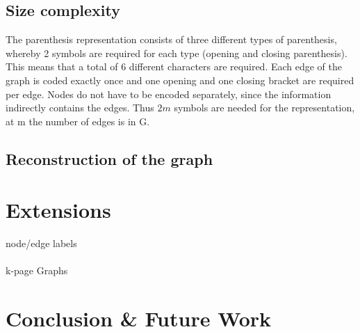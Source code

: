 \documentclass[a4paper]{scrartcl}
\begin{document}
\subsection{Size complexity}

The parenthesis representation consists of three different types of parenthesis, whereby 2 symbols are required for each type (opening and closing parenthesis). This means that a total of 6 different characters are required. Each edge of the graph is coded exactly once and one opening and one closing bracket are required per edge. Nodes do not have to be encoded separately, since the information indirectly contains the edges. Thus $2m$ symbols are needed for the representation, at m the number of edges is in G.


\subsection{Reconstruction of the graph}

\section{Extensions}

node/edge labels\\\\
k-page Graphs


\section{Conclusion \& Future Work}



\pagebreak


\printbibliography
\end{document}
